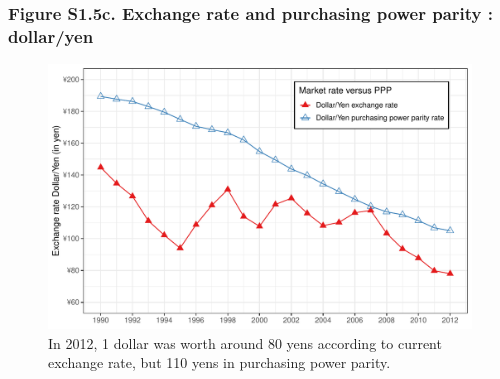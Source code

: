 \documentclass[t]{beamer}\usepackage[]{graphicx}\usepackage[]{color}
\newenvironment{knitrout}{}{} %
\begin{document}
\begin{frame}[label=Figure_S1_5c,fragile]
\frametitle{Figure S1.5c. Exchange rate and purchasing power parity : dollar/yen}
\begin{figure}[t]
\begin{minipage}[b]{\textwidth}
\centering
\begin{knitrout}\footnotesize
{}\color{fgcolor}

{\centering \includegraphics[width=1\linewidth]{figures/color/Figure_S1_5c} 

}



\end{knitrout}
\caption{In 2012, 1 dollar was worth around 80 yens according to current exchange rate, but 110 yens in purchasing power parity.}
\end{minipage}
\end{figure}
\end{frame}
\end{document}
